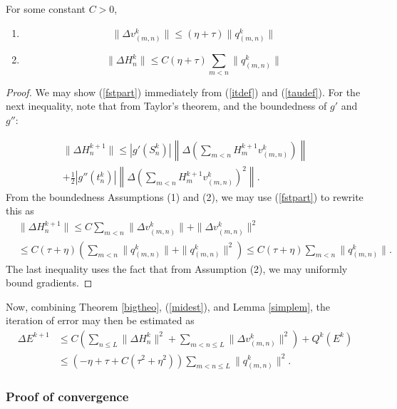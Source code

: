 \documentclass{jcmlatex}
\begin{document}
\begin{lemma}\label{simplem}
For some constant $C>0$,

\begin{enumerate}
\item 
\begin{equation}
\|\Delta v^k_{(m,n)}\| \le (\eta+\tau)\|q_{(m,n)}^k\| \label{fstpart}
\end{equation}
\item 
\begin{equation}
\|\Delta H^k_n\| \le C(\eta+\tau)\sum_{m<n}\|q_{(m,n)}^k\|
\end{equation}
\end{enumerate}
\end{lemma}\begin{proof}
We may show (\ref{fstpart}) immediately from (\ref{itdef}) and (\ref{taudef}).
For the next inequality, note that from Taylor's theorem, and the boundedness
of $g'$ and  $g''$:

\begin{align}
\|\Delta H^{k+1}_n\| \le |g'(S_n^k)|\left \|\Delta\left(\sum_{m < n} H_m^{k+1}v_{(m,n)}^k
 \right)\right \|\\ +\frac 12|g''(t_{n}^k)|\left \|\Delta\left(\sum_{m <
n}H_m^{k+1}v_{(m,n)}^k \right)^2\right \|.
\end{align}
From the boundedness Assumptions (1) and (2), we may use (\ref{fstpart}) to rewrite this as 
\begin{align}
&\|\Delta H^{k+1}_n\| \le C \sum_{m < n}\|\Delta v^k_{(m,n)}\|+\|\Delta v^k_{(m,n)}\|^2\\
&\le C(\tau+\eta)(\sum_{m< n}\|q_{(m,n)}^k\|+\|q_{(m,n)}^k\|^2) \le C(\tau+\eta)\sum_{m
< n}\|q_{(m,n)}^k\| .
\end{align}
 The last inequality uses the fact that from Assumption (2), we may uniformly
bound gradients. 
\end{proof}Now, combining Theorem \ref{bigtheo}, (\ref{midest}), and Lemma \ref{simplem},
the iteration of error may then be estimated as 
\begin{align}
\Delta E^{k+1} &\le  C\left(\sum_{n\le L}\|\Delta H_n^k\|^2 + \sum_{m<n\le
L}\|\Delta v_{(m,n)}^k\|^2\right)+Q^k(E^k)
\\&\le \left(-\eta+\tau+C(\tau^2+\eta^2)\right) \sum_{m<n \le L} \|q_{(m,n)}^k\|^2.
\label{graddif}
\end{align}\subsubsection{Proof of convergence}
\end{document}
